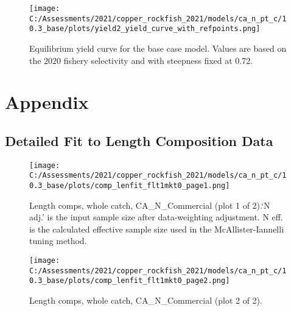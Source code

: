 \documentclass[11pt,
  english,
  a4paper,
]{article}
\begin{document}

\begin{figure}
\centering
\texttt{[image: C:/Assessments/2021/copper\_rockfish\_2021/models/ca\_n\_pt\_c/10.3\_base/plots/yield2\_yield\_curve\_with\_refpoints.png]}
\caption{Equilibrium yield curve for the base case model. Values are based on the 2020 fishery selectivity and with steepness fixed at 0.72.\label{fig:yield}}
\end{figure}

\tagmcend\tagstructend

\clearpage


\hypertarget{appendix}{%
\section{Appendix}\label{appendix}}

\leavevmode\tagmcend\tagstructend


\hypertarget{append-fit}{%
\subsection{Detailed Fit to Length Composition Data}\label{append-fit}}

\leavevmode\tagmcend\tagstructend


\begin{figure}
\centering
\texttt{[image: C:/Assessments/2021/copper\_rockfish\_2021/models/ca\_n\_pt\_c/10.3\_base/plots/comp\_lenfit\_flt1mkt0\_page1.png]}
\caption{Length comps, whole catch, CA\_N\_Commercial (plot 1 of 2).`N adj.' is the input sample size after data-weighting adjustment. N eff. is the calculated effective sample size used in the McAllister-Iannelli tuning method.\label{fig:comp_lenfit_flt1mkt0_page1}}
\end{figure}

\tagmcend\tagstructend


\begin{figure}
\centering
\texttt{[image: C:/Assessments/2021/copper\_rockfish\_2021/models/ca\_n\_pt\_c/10.3\_base/plots/comp\_lenfit\_flt1mkt0\_page2.png]}
\caption{Length comps, whole catch, CA\_N\_Commercial (plot 2 of 2).\label{fig:comp_lenfit_flt1mkt0_page2}}
\end{figure}
\end{document}
